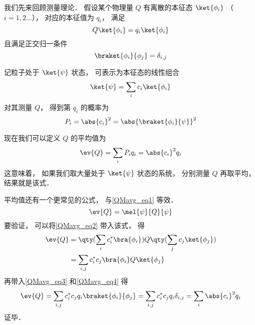 

我们先来回顾测量理论． 假设某个物理量 $Q$ 有离散的本征态 $\ket{\phi_i}$ （$i = 1,2\dots$）， 对应的本征值为 $q_i$， 满足
\begin{equation}\label{QMavg_eq3}
Q\ket{\phi_i} = q_i \ket{\phi_i}
\end{equation}
且满足正交归一条件
\begin{equation}\label{QMavg_eq4}
\braket{\phi_i}{\phi_j} = \delta_{i,j}
\end{equation}

记粒子处于 $\ket{\psi}$ 状态， 可表示为本征态的线性组合
\begin{equation}\label{QMavg_eq2}
\ket{\psi} = \sum_i c_i \ket{\phi_i}
\end{equation}
对其测量 $Q$， 得到第 $q_i$ 的概率为
\begin{equation}
P_i = \abs{c_i}^2 = \abs{\braket{\phi_i}{\psi}}^2
\end{equation}

现在我们可以定义 $Q$ 的平均值为
\begin{equation}\label{QMavg_eq1}
\ev{Q} = \sum_i P_i q_i = \abs{c_i}^2 q_i
\end{equation}
这意味着， 如果我们取大量处于 $\ket{\psi}$ 状态的系统， 分别测量 $Q$ 再取平均， 结果就是该式．

平均值还有一个更常见的公式， 与\autoref{QMavg_eq1} 等效．
\begin{equation}\label{QMavg_eq5}
\ev{Q} = \mel{\psi}{Q}{\psi}
\end{equation}
要验证， 可以将\autoref{QMavg_eq2} 带入该式， 得
\begin{equation}
\begin{aligned}
\ev{Q} &= \qty(\sum_i c_i^* \bra{\phi_i}) Q \qty(\sum_j c_j \ket{\phi_j})\\
&= \sum_{i,j} c_i^* c_j \bra{\phi_i} Q \ket{\phi_j}
\end{aligned} 
\end{equation}
再带入\autoref{QMavg_eq3} 和\autoref{QMavg_eq4} 得
\begin{equation}
\ev{Q} = \sum_{i,j} c_i^* c_j q_i \braket{\phi_i}{\phi_j}
= \sum_{i,j} c_i^* c_j q_i \delta_{i,j} = \sum_i \abs{c_i}^2 q_i
\end{equation}
证毕．







